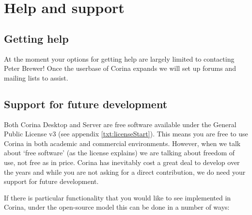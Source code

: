 \chapter{Help and support}


\section{Getting help}

At the moment your options for getting help are largely limited to contacting Peter Brewer!  Once the userbase of Corina expands we will set up forums and mailing lists to assist.


\section{Support for future development}
Both Corina Desktop and Server are free software available under the General Public License v3 (see appendix \ref{txt:licenseStart}).  This means you are free to use Corina in both academic and commercial environments.  However, when we talk about `free software' (as the license explains) we are talking about freedom of use, not free as in price.  Corina has inevitably cost a great deal to develop over the years and while you are not asking for a direct contribution, we do need your support for future development.

If there is particular functionality that you would like to see implemented in Corina, under the open-source model this can be done in a number of ways:

